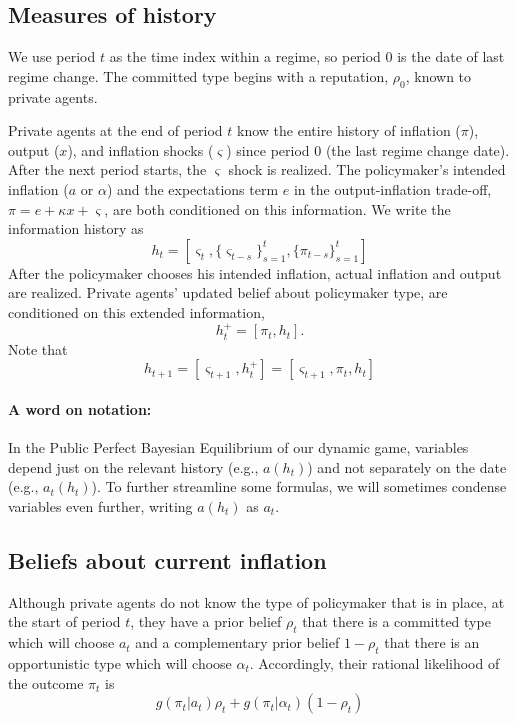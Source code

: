\documentclass[12pt,letter,leqno]{article}
\theoremstyle{asn}
\theoremstyle{lem}
\theoremstyle{slem}
\theoremstyle{prop}
\theoremstyle{appprop}
\theoremstyle{rem}
\theoremstyle{defn}
\begin{document}
\subsection{Measures of history}\label{appsec:recursive2}
We use period $t$ as the time index within a regime, so period 0 is the date of last regime change. The committed type begins with a reputation, $\rho _{0}$, known to private agents. 

Private agents at the end of period $t$ know the entire history of inflation ($\pi $), output ($x$), and inflation shocks ($\varsigma $) since period 0 (the last regime change date). After the
next period starts, the $\varsigma $ shock is realized. The policymaker's intended inflation ($a$ or $\alpha$) and the expectations term $e$ in the output-inflation trade-off, $\pi = e + \kappa x + \varsigma$, are both conditioned on this information. We write
the information history as 
\begin{equation*}
h_{t}=[\varsigma _{t},\{\varsigma _{t-s}\}_{s=1}^t,\{\pi
_{t-s}\}_{s=1}^t]
\end{equation*}
After the policymaker chooses his intended inflation, actual inflation and
output are realized. Private agents' updated belief about policymaker type, are conditioned on this extended information,  
\begin{equation*}
h_{t}^{+}=[\pi _{t},h_{t}].
\end{equation*}%
Note that 
\begin{equation*}
h_{t+1}=[\varsigma _{t+1},h_{t}^{+}]=[\varsigma _{t+1},\pi _{t},h_{t}]
\end{equation*}

\paragraph{A word on notation:} In the Public Perfect Bayesian Equilibrium of our 
dynamic game, variables depend just on the relevant history (e.g., $a(h_{t})$) and not separately on the date (e.g., $a_{t}(h_{t})$). To further streamline some formulas, we will sometimes condense variables even further, writing $a(h_{t})$ as $a_{t}$.

\subsection{Beliefs about current inflation}\label{appsec:recursive3}

Although private agents do not know the type of policymaker that is in
place, at the start of period $t$, they have a prior belief $\rho _{t}$ that
there is a committed type which will choose $a_{t}$ and a complementary prior
belief $1-\rho _{t}$ that there is an opportunistic type which will choose $%
\alpha _{t}$. Accordingly, their rational likelihood of the outcome $\pi _{t}
$ is
\begin{equation}
g(\pi _{t}|a_{t})\rho _{t}+g(\pi _{t}|\alpha _{t})(1-\rho _{t})
\label{pub prob pi}
\end{equation}
\end{document}
